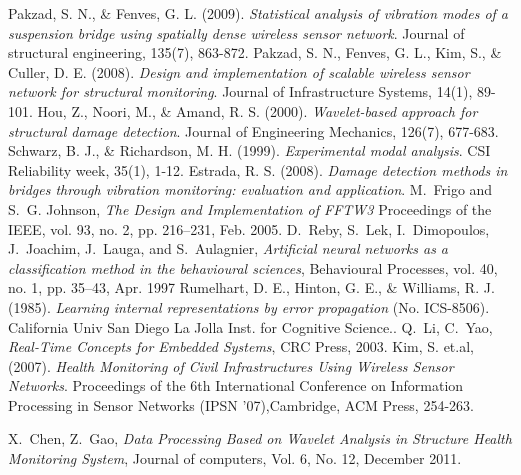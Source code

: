 \documentclass[journal,trans]{IEEEtran}
\begin{document}
%
%
%
\begin{thebibliography}{1}
Pakzad, S. N., \& Fenves, G. L. (2009). \emph{Statistical analysis of vibration modes of a suspension bridge using spatially dense wireless sensor network}. Journal of structural engineering, 135(7), 863-872.
Pakzad, S. N., Fenves, G. L., Kim, S., \& Culler, D. E. (2008).  \emph{Design and implementation of scalable wireless sensor network for structural monitoring}. Journal of Infrastructure Systems, 14(1), 89-101.
Hou, Z., Noori, M., \& Amand, R. S. (2000). \emph{Wavelet-based approach for structural damage detection}. Journal of Engineering Mechanics, 126(7), 677-683.
Schwarz, B. J., \& Richardson, M. H. (1999). \emph{Experimental modal analysis}. CSI Reliability week, 35(1), 1-12.
Estrada, R. S. (2008). \emph{Damage detection methods in bridges through vibration monitoring: evaluation and application}.
M.~Frigo and S.~G. Johnson, \emph{The Design and Implementation of FFTW3} Proceedings of the IEEE, vol. 93, no. 2, pp. 216–231, Feb. 2005.
D.~Reby, S.~Lek, I.~Dimopoulos, J.~Joachim, J.~Lauga, and S.~Aulagnier, \emph{Artificial neural networks as a classification method in the behavioural sciences}, Behavioural Processes, vol. 40, no. 1, pp. 35–43, Apr. 1997
Rumelhart, D. E., Hinton, G. E., \& Williams, R. J. (1985). \emph{Learning internal representations by error propagation} (No. ICS-8506). California Univ San Diego La Jolla Inst. for Cognitive  Science..
Q.~Li, C.~Yao, \emph{Real-Time Concepts for Embedded Systems}, CRC Press, 2003.
Kim, S. et.al, (2007). \emph{Health Monitoring of Civil Infrastructures Using Wireless Sensor Networks}. Proceedings of the 6th International Conference on Information Processing in Sensor Networks (IPSN '07),Cambridge, ACM Press, 254-263.
 

X.~Chen, Z.~Gao, \emph{ Data Processing Based on Wavelet Analysis in Structure Health Monitoring System}, Journal of computers, Vol. 6, No. 12, December 2011.


\end{thebibliography}
\end{document}
